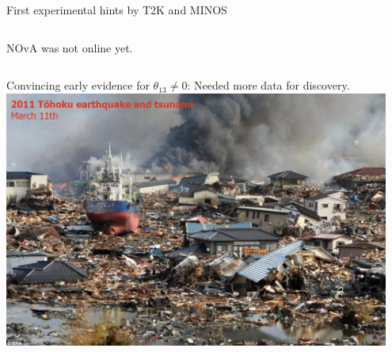 \begin{frame}{First experimental hints by T2K and MINOS}
\begin{columns}
\begin{column}{0.40\textwidth}
\begin{center}
         \vspace{0.3cm}
         NOvA was not online yet.
         \end{center}
    \end{column}
  \end{columns}

\end{frame}


\begin{frame}{}

  \begin{center}
   Convincing early evidence for $\theta_{13} \ne 0$: Needed more data for discovery.\\
   \vspace{0.2cm}
   \includegraphics[width=0.95\textwidth]{./images/3nu/accelerator/tohoku_earthquake}\\
  \end{center}

\end{frame}

%
%
%

